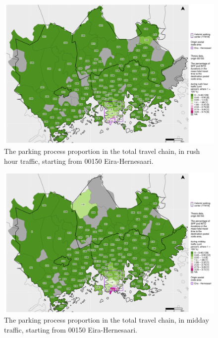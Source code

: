\begin{figure}[H]%
    \centering
    \includegraphics[trim={0.9cm 0.3cm 0.25cm 0.3cm},clip,width=\textwidth]{images/compare_traveltimes_mapfill-msc_r_pct_fromzip-00150_28-09-2020.png}
    \caption[Parking process proportion from Eira-Hernesaari, rush hour traffic]{The parking process proportion in the total travel chain, in rush hour traffic, starting from 00150 Eira-Hernesaari.}%
    \label{fig:compare_msc_r_pct_00150}%
\end{figure}

\begin{figure}[H]%
    \centering
    \includegraphics[trim={0.9cm 0.3cm 0.25cm 0.3cm},clip,width=\textwidth]{images/compare_traveltimes_mapfill-msc_m_pct_fromzip-00150_28-09-2020.png}
    \caption[Parking process proportion from Eira-Hernesaari, midday traffic]{The parking process proportion in the total travel chain, in midday traffic, starting from 00150 Eira-Hernesaari.}%
    \label{fig:compare_msc_m_pct_00150}%
\end{figure}

